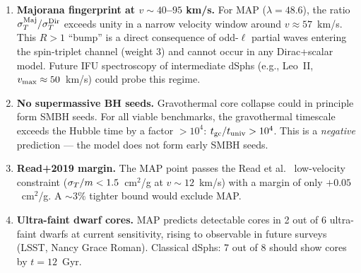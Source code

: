\begin{enumerate}
\item \textbf{Majorana fingerprint at $v \sim 40$--$95$ km/s.}
      For MAP ($\lambda = 48.6$), the ratio $\sigma_T^{\rm Maj}/\sigma_T^{\rm Dir}$
      exceeds unity in a narrow velocity window around $v \approx 57$~km/s.
      This $R > 1$ ``bump'' is a direct consequence of odd-$\ell$ partial waves
      entering the spin-triplet channel (weight 3) and cannot occur in any
      Dirac+scalar model. Future IFU spectroscopy of intermediate dSphs
      (e.g., Leo~II, $v_{\rm max} \approx 50$~km/s) could probe this regime.

\item \textbf{No supermassive BH seeds.}
      Gravothermal core collapse could in principle form SMBH seeds.
      For all viable benchmarks, the gravothermal timescale exceeds the
      Hubble time by a factor $> 10^4$: $t_{\rm gc}/t_{\rm univ} > 10^4$.
      This is a \emph{negative} prediction — the model does not form early SMBH seeds.

\item \textbf{Read+2019 margin.}
      The MAP point passes the Read et al.~\cite{Read2019} low-velocity constraint
      ($\sigma_T/m < 1.5$~cm$^2$/g at $v \sim 12$~km/s) with a margin of only
      $+0.05$~cm$^2$/g. A $\sim 3\%$ tighter bound would exclude MAP.

\item \textbf{Ultra-faint dwarf cores.}
      MAP predicts detectable cores in 2 out of 6 ultra-faint dwarfs at current
      sensitivity, rising to observable in future surveys (LSST, Nancy Grace Roman).
      Classical dSphs: 7 out of 8 should show cores by $t = 12$~Gyr.
\end{enumerate}
